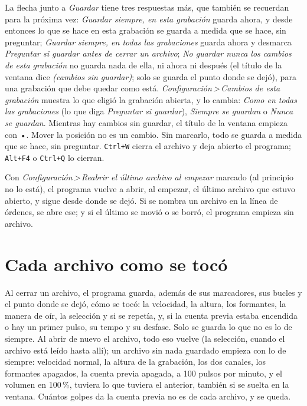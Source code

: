 \documentclass[12pt,
              article,
              oneside
              ]{memoir}
\newcommand*{\menu}[1]{\textit{#1}}
\newcommand*{\then}{\,>\,}
\newcommand*{\key}[1]{\texttt{#1}}
\begin{document}
%
La flecha junto a \menu{Guardar} tiene tres respuestas más, que también se
recuerdan para la próxima vez: \menu{Guardar siempre, en esta grabación}
guarda ahora, y desde entonces lo que se hace en esta grabación se guarda a
medida que se hace, sin preguntar; \menu{Guardar siempre, en todas las
grabaciones} guarda ahora y desmarca \menu{Preguntar si guardar antes de
cerrar un archivo}; \menu{No guardar nunca los cambios de esta grabación}
no guarda nada de ella, ni ahora ni después (el título de la ventana dice
\menu{(cambios sin guardar)}; solo se guarda el punto donde se dejó), para una
grabación que debe quedar como está. \menu{Configuración\then Cambios de
esta grabación} muestra lo que eligió la grabación abierta, y lo cambia:
\menu{Como en todas las grabaciones} (lo que diga \menu{Preguntar si
guardar}), \menu{Siempre se guardan} o \menu{Nunca se guardan}.
Mientras hay cambios sin guardar, el título de la ventana empieza con •.
Mover la posición no es un cambio. Sin marcarlo, todo se guarda a medida
que se hace, sin preguntar. \key{Ctrl+W} cierra el archivo y deja abierto
el programa; \key{Alt+F4} o \key{Ctrl+Q} lo cierran.

Con \menu{Configuración\then Reabrir el último archivo al empezar} marcado
(al principio no lo está), el programa vuelve a abrir, al empezar, el
último archivo que estuvo abierto, y sigue desde donde se dejó. Si se nombra
un archivo en la línea de órdenes, se abre ese; y si el último se movió o se
borró, el programa empieza sin archivo.

\section{Cada archivo como se tocó}
\label{sec:cada-archivo}

%
Al cerrar un archivo, el programa guarda, además de sus marcadores, sus
bucles y el punto donde se dejó, cómo se tocó: la velocidad, la altura, los
formantes, la manera de oír, la selección y si se repetía, y, si la cuenta
previa estaba encendida o hay un primer pulso, su tempo y su desfase. Solo se guarda lo que no es
lo de siempre. Al abrir de nuevo el archivo, todo eso vuelve (la selección,
cuando el archivo está leído hasta allí); un archivo sin nada guardado
empieza con lo de siempre: velocidad normal, la altura de la grabación, los
dos canales, los formantes apagados, la cuenta previa apagada, a 100
pulsos por minuto, y el volumen en 100\,\%, tuviera lo que tuviera el
anterior, también si se suelta en la ventana. Cuántos golpes da la cuenta
previa no es de cada archivo, y se queda.
\end{document}
